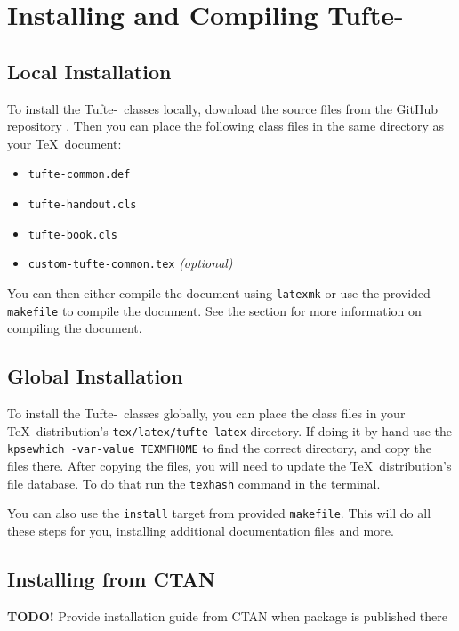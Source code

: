 \documentclass[a4paper]{tufte-book}
\newcommand{\TL}{Tufte-\hologo{LaTeX}\xspace}
\newcommand{\TODO}[1]{\textcolor{tufte-red}{\textbf{TODO!} #1}\xspace}
\begin{document}
\chapter[Installing and Compiling Tufte-LaTeX]{Installing and Compiling \TL}\label{ch:installing}
\section{Local Installation}\label{sec:local-installation}
To install the \TL\ classes locally, download the source files from the GitHub repository%
.
Then you can place the following class files in the same directory as your \TeX\ document:
\begin{itemize}
  \item \texttt{tufte-common.def}
  \item \texttt{tufte-handout.cls}
  \item \texttt{tufte-book.cls}
  \item \texttt{custom-tufte-common.tex} \textit{(optional)}
\end{itemize}

You can then either compile the document using \texttt{latexmk} or use the provided \texttt{makefile} to compile the document.
See the  section for more information on compiling the document.


\section{Global Installation}\label{sec:global-installation}
To install the \TL\ classes globally, you can place the class files in your \TeX\ distribution's \texttt{tex/latex/tufte-latex} directory.
If doing it by hand use the \texttt{kpsewhich -var-value TEXMFHOME} to find the correct directory, and copy the files there.
After copying the files, you will need to update the \TeX\ distribution's file database.
To do that run the \texttt{texhash} command in the terminal.

You can also use the \texttt{install} target from provided \texttt{makefile}.
This will do all these steps for you, installing additional documentation files and more.


\section{Installing from CTAN}\label{sec:installing-from-ctan}
\TODO{Provide installation guide from CTAN when package is published there}
\end{document}
